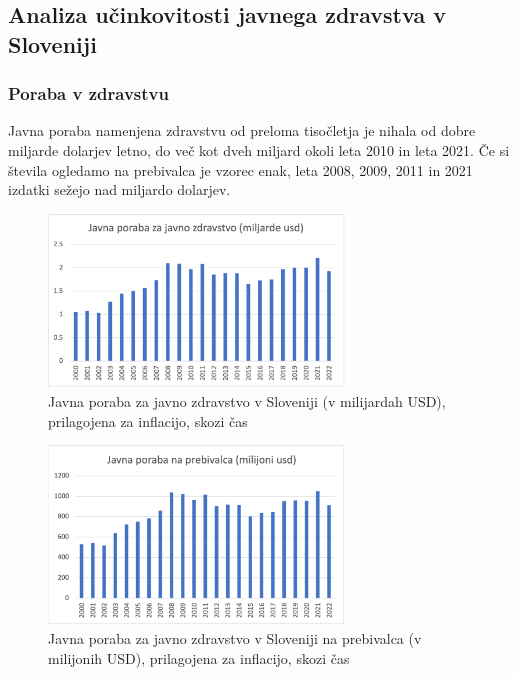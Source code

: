 \documentclass[12pt,a4paper]{article}
\theoremstyle{definition}
\begin{document}
\subsection{Analiza učinkovitosti javnega zdravstva v Sloveniji}
\subsubsection{Poraba v zdravstvu}

Javna poraba namenjena zdravstvu od preloma tisočletja je nihala od dobre miljarde dolarjev letno, do več kot dveh miljard okoli leta 2010 in leta 2021. 
Če si števila ogledamo na prebivalca je vzorec enak, leta 2008, 2009, 2011 in 2021 izdatki sežejo nad miljardo dolarjev.
\begin{figure}[H]   %
    \centering       %
    \includegraphics[width=0.7\textwidth]{jav_por_zdr_slo.png} %
    \caption{Javna poraba za javno zdravstvo v Sloveniji (v milijardah USD), prilagojena za inflacijo, skozi čas}   %
    \label{fig:jav_por_zdr_slo} %
  \end{figure}

\begin{figure}[H]
    \centering
    \includegraphics[width=0.7\textwidth]{jav_por_prb_slo.png}
    \caption{Javna poraba za javno zdravstvo v Sloveniji na prebivalca (v milijonih USD), prilagojena za inflacijo, skozi čas}
    \label{fig:jav_por_prb_slo.png}
  \end{figure}
\end{document}
